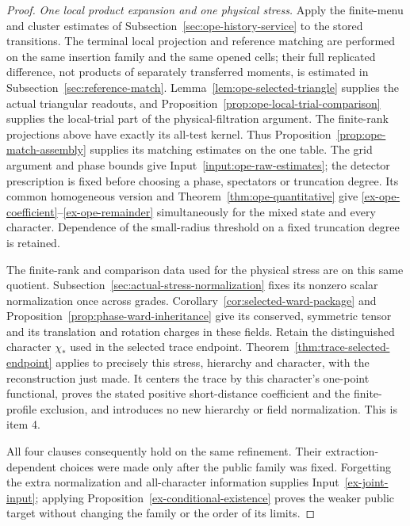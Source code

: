 \begin{proof}
\emph{One local product expansion and one physical stress.}
Apply the finite-menu and cluster estimates of
Subsection~\ref{sec:ope-history-service} to the stored transitions.
The terminal local projection and reference matching are performed on
the same insertion family and the same opened cells; their full
replicated difference, not products of separately transferred moments,
is estimated in Subsection~\ref{sec:reference-match}.
Lemma~\ref{lem:ope-selected-triangle} supplies the actual triangular
readouts, and Proposition~\ref{prop:ope-local-trial-comparison} supplies
the local-trial part of the physical-filtration argument. The
finite-rank projections above have exactly its all-test kernel.
Thus Proposition~\ref{prop:ope-match-assembly} supplies its matching
estimates on the one table. The grid argument and phase bounds give
Input~\ref{input:ope-raw-estimates}; the detector prescription is fixed
before choosing a phase, spectators or truncation degree. Its common
homogeneous version and Theorem~\ref{thm:ope-quantitative} give
\eqref{ex-ope-coefficient}--\eqref{ex-ope-remainder} simultaneously
for the mixed state and every character. Dependence of the small-radius
threshold on a fixed truncation degree is retained.

The finite-rank and comparison data used for the physical stress are
on this same quotient. Subsection~\ref{sec:actual-stress-normalization}
fixes its nonzero scalar normalization once across grades.
Corollary~\ref{cor:selected-ward-package} and
Proposition~\ref{prop:phase-ward-inheritance} give its conserved,
symmetric tensor and its translation and rotation charges in these
fields. Retain the distinguished character $\chi_*$ used in the
selected trace endpoint. Theorem~\ref{thm:trace-selected-endpoint}
applies to precisely this stress, hierarchy and character, with the
reconstruction just made. It centers the trace by this character's
one-point functional, proves the stated positive short-distance
coefficient and the finite-profile exclusion, and introduces no new
hierarchy or field normalization. This is item 4.

All four clauses consequently hold on the same refinement. Their
extraction-dependent choices were made only after the public family
was fixed. Forgetting the extra normalization and all-character
information supplies Input~\ref{ex-joint-input}; applying
Proposition~\ref{ex-conditional-existence} proves the weaker public
target without changing the family or the order of its limits.
\end{proof}
